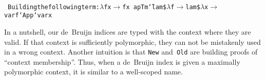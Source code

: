 \documentclass[9pt,authoryear]{sigplanconf}
\begin{document}
%
%
%
~\\~\vphantom{$\{$}\texttt{\makebox[1.22ex][c]{-}\makebox[1.22ex][c]{-}\mbox{\hspace{0.50em}}Building\mbox{\hspace{0.50em}}the\mbox{\hspace{0.50em}}following\mbox{\hspace{0.50em}}term{:}\mbox{\hspace{0.50em}}$ \lambda $\mbox{\hspace{0.50em}}f\mbox{\hspace{0.50em}}x\mbox{\hspace{0.50em}}$ \rightarrow $\mbox{\hspace{0.50em}}f\mbox{\hspace{0.50em}}x}\texttt{{\nopagebreak \newline%
}\vphantom{$\{$}}\texttt{apTm}\texttt{\mbox{\hspace{0.50em}}}\texttt{{\char `\=}}\texttt{\mbox{\hspace{0.50em}}}\texttt{lam}\texttt{\mbox{\hspace{0.50em}}}\texttt{\${}}\texttt{\mbox{\hspace{0.50em}}}\texttt{$ \lambda $}\texttt{\mbox{\hspace{0.50em}}}\texttt{f}\texttt{\mbox{\hspace{0.50em}}}\texttt{$ \rightarrow $}\texttt{\mbox{\hspace{0.50em}}}\texttt{lam}\texttt{\mbox{\hspace{0.50em}}}\texttt{\${}}\texttt{\mbox{\hspace{0.50em}}}\texttt{$ \lambda $}\texttt{\mbox{\hspace{0.50em}}}\texttt{x}\texttt{\mbox{\hspace{0.50em}}}\texttt{$ \rightarrow $}\texttt{\mbox{\hspace{0.50em}}}\texttt{var}\texttt{\mbox{\hspace{0.50em}}}\texttt{f}\texttt{\mbox{\hspace{0.50em}}}\texttt{{`}App{`}}\texttt{\mbox{\hspace{0.50em}}}\texttt{var}\texttt{\mbox{\hspace{0.50em}}}\texttt{x}\texttt{{\nopagebreak \newline%
}\vphantom{$\{$}}%


%
In a nutshell, our de{~}Bruijn indices are typed with the context
    where they are valid. If that context is sufficiently polymorphic,
    they can not be mistakenly used in a wrong context. Another
    intuition is that \texttt{New} and{~}\texttt{Old} are building proofs of
    {``}context membership{''}. Thus, when a de{~}Bruijn index is given a
    maximally polymorphic context, it is similar to a well-scoped name.%
\end{document}
